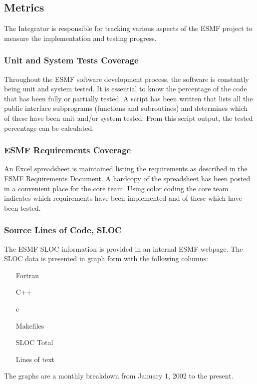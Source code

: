 \subsection{Metrics}

The Integrator is responsible for tracking various aspects of the
ESMF project to measure the implementation and testing progress.
\subsubsection{Unit and System Tests Coverage}
Throughout the ESMF software development process, the software is constantly
being unit and system tested. It is essential to know the percentage of the
code that has been fully or partially tested. A script has been written that 
lists all the public interface subprograms (functions and subroutines) and 
determines which of these have been unit and/or system tested. From this script
output, the tested percentage can be calculated.
\subsubsection{ESMF Requirements Coverage}
An Excel spreadsheet is maintained listing the requirements as described in the
ESMF Requirements Document. A hardcopy of the spreadsheet has been posted in a
convenient place for the core team. Using color coding the core team indicates
which requirements have been implemented and of these which have been tested.
\subsubsection{Source Lines of Code, SLOC}
The ESMF SLOC information is provided in an internal ESMF webpage. The
SLOC data is presented in graph form with the following columns:
\begin{enumerate}
\item[Fortran] 
\item[C++] 
\item[c] 
\item[Makefiles] 
\item[SLOC Total] 
\item[Lines of text] 
\end{enumerate}

The graphs are a monthly breakdown from January 1, 2002 to the present.
























